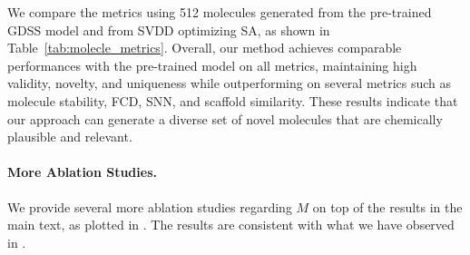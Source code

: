 We compare the metrics using 512 molecules generated from the pre-trained GDSS model and from SVDD optimizing SA, as shown in Table~\ref{tab:molecle_metrics}. Overall, our method achieves comparable performances with the pre-trained model on all metrics, maintaining high validity, novelty, and uniqueness while outperforming on several metrics such as molecule stability, FCD, SNN, and scaffold similarity. These results indicate that our approach can generate a diverse set of novel molecules that are chemically plausible and relevant.


\paragraph{More Ablation Studies.}

We provide several more ablation studies regarding $M$ on top of the results in the main text, as plotted in . The results are consistent with what we have observed in .

